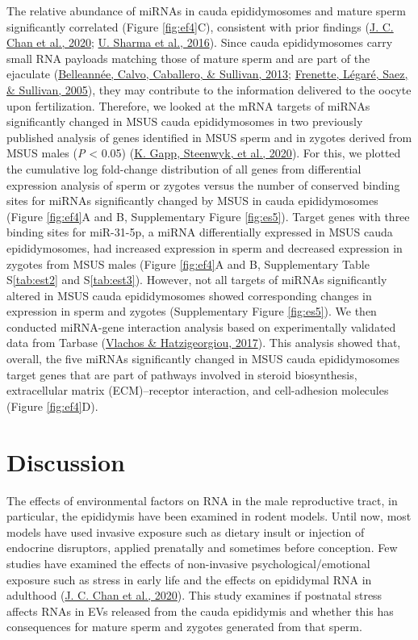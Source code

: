 \documentclass[12pt,twoside]{reedthesis}
\begin{document}
The relative abundance of miRNAs in cauda epididymosomes and mature
sperm significantly correlated (Figure \ref{fig:ef4}C), consistent with prior
findings (\protect\hyperlink{ref-chan_2020}{J. C. Chan et al., 2020}; \protect\hyperlink{ref-sharma_2016}{U. Sharma et al., 2016}). Since cauda epididymosomes carry
small RNA payloads matching those of mature sperm and are part of the
ejaculate (\protect\hyperlink{ref-belleanne_2013a}{Belleannée, Calvo, Caballero, \& Sullivan, 2013}; \protect\hyperlink{ref-frenette_2005}{Frenette, Légaré, Saez, \& Sullivan, 2005}), they may contribute to the
information delivered to the oocyte upon fertilization. Therefore, we
looked at the mRNA targets of miRNAs significantly changed in MSUS cauda
epididymosomes in two previously published analysis of genes identified
in MSUS sperm and in zygotes derived from MSUS males (\emph{P} \textless{} 0.05)
(\protect\hyperlink{ref-gapp_2020}{K. Gapp, Steenwyk, et al., 2020}). For this, we plotted the cumulative log fold-change
distribution of all genes from differential expression analysis of sperm
or zygotes versus the number of conserved binding sites for miRNAs
significantly changed by MSUS in cauda epididymosomes (Figure \ref{fig:ef4}A and
B, Supplementary Figure \ref{fig:es5}). Target genes with three binding sites
for miR-31-5p, a miRNA differentially expressed in MSUS cauda
epididymosomes, had increased expression in sperm and decreased
expression in zygotes from MSUS males (Figure \ref{fig:ef4}A and B, Supplementary
Table S\ref{tab:est2} and S\ref{tab:est3}). However, not all targets of miRNAs significantly
altered in MSUS cauda epididymosomes showed corresponding changes in
expression in sperm and zygotes (Supplementary Figure \ref{fig:es5}). We then
conducted miRNA-gene interaction analysis based on experimentally
validated data from Tarbase (\protect\hyperlink{ref-vlachos_2017}{Vlachos \& Hatzigeorgiou, 2017}). This analysis showed that,
overall, the five miRNAs significantly changed in MSUS cauda
epididymosomes target genes that are part of pathways involved in
steroid biosynthesis, extracellular matrix (ECM)--receptor interaction,
and cell-adhesion molecules (Figure \ref{fig:ef4}D).

\hypertarget{discussion-1}{%
\section{Discussion}\label{discussion-1}}

The effects of environmental factors on RNA in the male reproductive
tract, in particular, the epididymis have been examined in rodent
models. Until now, most models have used invasive exposure such as
dietary insult or injection of endocrine disruptors, applied prenatally
and sometimes before conception. Few studies have examined the effects
of non-invasive psychological/emotional exposure such as stress in early
life and the effects on epididymal RNA in adulthood (\protect\hyperlink{ref-chan_2020}{J. C. Chan et al., 2020}). This
study examines if postnatal stress affects RNAs in EVs released from the
cauda epididymis and whether this has consequences for mature sperm and
zygotes generated from that sperm.
\end{document}
